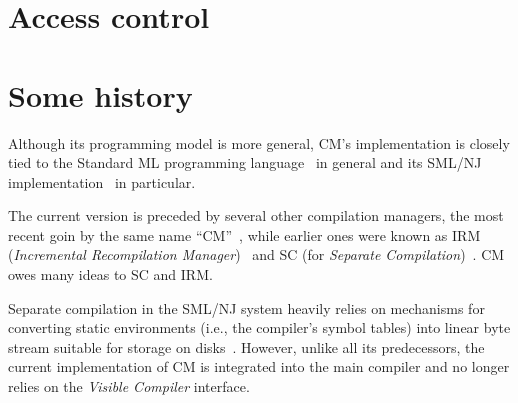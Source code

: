 \documentclass{article}
\begin{document}
\section{Access control}
\label{sec:access}

\section{Some history}

Although its programming model is more general, CM's implementation is
closely tied to the Standard ML programming language~\cite{milner97}
in general and its SML/NJ implementation~\cite{appel91:sml} in particular.

The current version is preceded by several other compilation managers,
the most recent goin by the same name ``CM''~\cite{blume95:cm}, while
earlier ones were known as IRM ({\it Incremental Recompilation
Manager})~\cite{harper94:irm} and SC (for {\it Separate
Compilation})~\cite{harper-lee-pfenning-rollins-CM}.  CM owes many
ideas to SC and IRM.

Separate compilation in the SML/NJ system heavily relies on mechanisms
for converting static environments (i.e., the compiler's symbol
tables) into linear byte stream suitable for storage on
disks~\cite{appel94:sepcomp}.  However, unlike all its predecessors,
the current implementation of CM is integrated into the main compiler
and no longer relies on the {\em Visible Compiler} interface.

\cleardoublepage

\tableofcontents

\pagebreak


\end{document}
